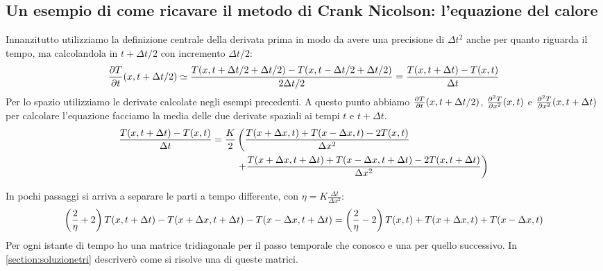 \subsection{Un esempio di come ricavare il metodo di Crank Nicolson: l'equazione del calore}
Innanzitutto utilizziamo la definizione centrale della derivata prima in modo da avere una precisione di $\Delta t^2$ anche per quanto riguarda il tempo, ma  calcolandola in $t+\Delta t/2$ con incremento $\Delta t/2$:
\begin{equation}
  \pde{T}t(x,t+\Delta t/2) \simeq \frac{T(x,t+\Delta t/2+\Delta t/2)-T(x,t-\Delta t/2+\Delta t/2)}{2 \Delta t/2} = \frac{T(x,t+\Delta t)-T(x,t)}{\Delta t}
\end{equation}
Per lo spazio utilizziamo le derivate calcolate negli esempi precedenti.
A questo punto abbiamo $\pde{T}t(x,t+\Delta t/2)$, $\pde{^2T}{x^2}(x,t)$ e $\pde{^2T}{x^2}(x,t+\Delta t)$ per calcolare l'equazione facciamo la media delle due derivate spaziali ai tempi $t$ e $t+\Delta t$.
\begin{equation}\label{eq:HeatForCrank}
  \begin{aligned}
    \frac{T(x,t+\Delta t)-T(x,t)}{\Delta t} = \frac K2 &\lr(.{\frac{T(x+\Delta x,t)+T(x-\Delta x,t)-2T(x,t)}{\Delta x^2}}\\
    &\lr.){+\frac{T(x+\Delta x,t+\Delta t)+T(x-\Delta x,t+\Delta t)-2T(x,t+\Delta t)}{\Delta x^2}}
  \end{aligned}
\end{equation}

In pochi passaggi si arriva a separare le parti a tempo differente, con $\eta = K\frac{\Delta t}{\Delta x^2}$:
\begin{equation}
  \lrt{\frac 2\eta +2}T(x,t+\Delta t) -T(x+\Delta x,t+\Delta t)-T(x-\Delta x,t+\Delta t) = \lrt{\frac 2\eta -2}T(x,t)+T(x+\Delta x,t)+T(x-\Delta x,t)
\end{equation}
Per ogni istante di tempo ho una matrice tridiagonale per il passo temporale che conosco e una per quello successivo. In \autoref{section:soluzionetri} descriver\`o come si risolve una di queste matrici.
